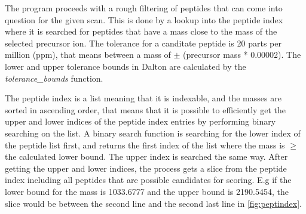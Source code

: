\documentclass[11pt]{article}
\begin{document}
The program proceeds with a rough filtering of peptides that can come into question for the given scan. This is done by a lookup into the peptide index where it is searched for peptides that have a mass close to the mass of the selected precursor ion. The tolerance for a canditate peptide is 20 parts per million (ppm), that means between a mass of $\pm$ (precursor mass * 0.00002). The lower and upper tolerance bounds in Dalton are calculated by the \textit{tolerance\_bounds} function. 

The peptide index is a list meaning that it is indexable, and the masses are sorted in ascending order, that means that it is possible to efficiently get the upper and lower indices of the peptide index entries by performing binary searching on the list. A binary search function is searching for the lower index of the peptide list first, and returns the first index of the list where the mass is $\ge$ the calculated lower bound. The upper index is searched the same way. After getting the upper and lower indices, the process gets a slice from the peptide index including all peptides that are possible candidates for scoring. E.g if the lower bound for the mass is 1033.6777 and the upper bound is 2190.5454, the slice would be between the second line and the second last line in \cref{fig:peptindex}.
\end{document}
